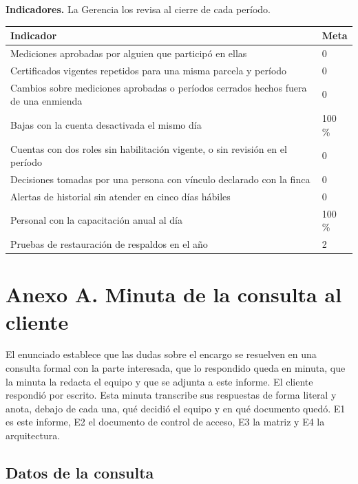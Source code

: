 \documentclass[11pt,letterpaper]{article}
\newcommand{\cab}[1]{\textbf{\rmfamily #1}}
\begin{document}
\textbf{Indicadores.} La Gerencia los revisa al cierre de cada período.

\begin{center}
\small
\renewcommand{\arraystretch}{1.2}
\begin{tabularx}{\textwidth}{@{}Y L{2.6cm}@{}}
\toprule
\cab{Indicador} & \cab{Meta} \\
\midrule
Mediciones aprobadas por alguien que participó en ellas & 0 \\
Certificados vigentes repetidos para una misma parcela y período & 0 \\
Cambios sobre mediciones aprobadas o períodos cerrados hechos fuera de una enmienda & 0 \\
Bajas con la cuenta desactivada el mismo día & 100 \% \\
Cuentas con dos roles sin habilitación vigente, o sin revisión en el período & 0 \\
Decisiones tomadas por una persona con vínculo declarado con la finca & 0 \\
Alertas de historial sin atender en cinco días hábiles & 0 \\
Personal con la capacitación anual al día & 100 \% \\
Pruebas de restauración de respaldos en el año & 2 \\
\bottomrule
\end{tabularx}
\end{center}

\clearpage
\section*{Anexo A. Minuta de la consulta al cliente}
\label{anexo:minuta}

El enunciado establece que las dudas sobre el encargo se resuelven en una consulta formal con la parte
interesada, que lo respondido queda en minuta, que la minuta la redacta el equipo y que se adjunta a
este informe. El cliente respondió por escrito. Esta minuta transcribe sus respuestas de forma literal
y anota, debajo de cada una, qué decidió el equipo y en qué documento quedó. E1 es este informe, E2 el
documento de control de acceso, E3 la matriz y E4 la arquitectura.

\subsection*{Datos de la consulta}
\end{document}
